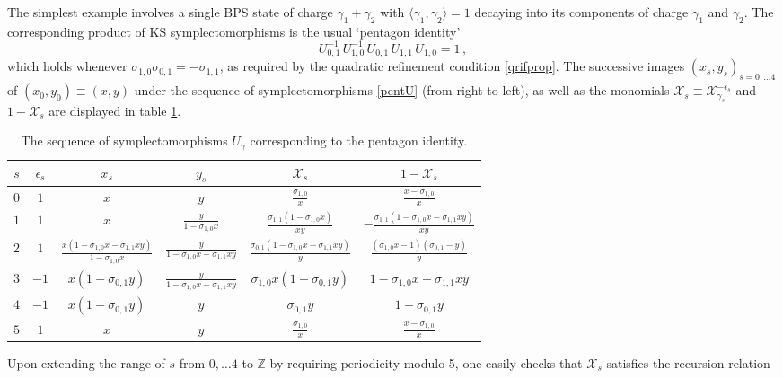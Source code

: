 \documentclass[12pt,reqno]{article}
\numberwithin{equation}{section}
\newcommand{\be}{\begin{equation}}
\newcommand{\ee}{\end{equation}}
\def\eps{\varepsilon}
\newcommand{\cX}{\mathcal{X}}
\newcommand{\IZ}{\mathbb{Z}}
\def\eps{\epsilon}
\def\zz{\cX}
\def\ind{s}
\numberwithin{equation}{section}
\begin{document}
The simplest example involves a single BPS state of charge $\gamma_1+\gamma_2$
with $\langle\gamma_1,\gamma_2\rangle=1$ decaying into its components
of charge $\gamma_1$ and $\gamma_2$. The corresponding product of KS
symplectomorphisms is the usual `pentagon identity'
\be
\label{pentU}
U_{0,1}^{-1}\, U_{1,0}^{-1}\, U_{0,1}\, U_{1,1}\, U_{1,0} = 1\, ,
\ee
which holds whenever $\sigma_{1,0}\sigma_{0,1}=-\sigma_{1,1}$, as required by
the quadratic refinement condition \eqref{qrifprop}. The successive
images  $(x_\ind,y_\ind)_{\ind=0,\dots 4}$ of $(x_0,y_0)\equiv(x,y)$ under the sequence of
symplectomorphisms \eqref{pentU} (from right to left), as well as the monomials
$\zz_\ind\equiv \zz_{\gamma_\ind}^{-\eps_\ind}$ and $1-\zz_\ind$
  are displayed in table \ref{pentagontable}.
\begin{table}[t]
\begin{center}
\begin{tabular}{|c||c|c|c|c|c|}
\hline
$\ind $ & $ \eps_\ind $ & $ x_\ind $ & $ y_\ind $ & $  \zz_\ind $ & $  1-\zz_\ind
$ \\ \hline
$0 $ & $ 1 $ & $ x $ & $ y $ & $ \frac{\sigma_{1,0}}{x} $ & $ \frac{x-\sigma_{1,0}}{x}
$ \\
$1 $ & $ 1 $ & $ x $ & $ \frac{y}{1-\sigma_{1,0}x} $ & $ \frac{\sigma_{1,1}(1-\sigma_{1,0}x)}{xy}$ & $
- \frac{\sigma_{1,1}(1-\sigma_{1,0}x-\sigma_{1,1}xy)}{xy}
$ \\
$2 $ & $ 1 $ & $ \frac{x(1-\sigma_{1,0} x -\sigma_{1,1} xy)}{1-\sigma_{1,0}x} $ & $
\frac{y}{1-\sigma_{1,0}x-\sigma_{1,1} xy} $ & $ \frac{\sigma_{0,1}(1-\sigma_{1,0}x-\sigma_{1,1}xy)}{y}
 $ & $ \frac{(\sigma_{1,0}x-1)(\sigma_{0,1}-y)}{y}
$ \\
$3 $ & $ -1 $ & $ x(1-\sigma_{0,1} y) $ & $  \frac{y}{1-\sigma_{1,0}x-\sigma_{1,1}xy}
$ & $ \sigma_{1,0} x(1-\sigma_{0,1} y) $ & $ 1-\sigma_{1,0}x-\sigma_{1,1}xy
$ \\
$4 $ & $ -1 $ & $ x(1-\sigma_{0,1}y)$ & $ y
$ & $\sigma_{0,1} y $ & $ 1-\sigma_{0,1}y
$ \\
$5 $ & $ 1 $ & $ x $ & $ y$ & $ \frac{\sigma_{1,0}}{x} $ & $ \frac{x-\sigma_{1,0}}{x} $
\\
\hline
\end{tabular}
\end{center}
\caption{The sequence of symplectomorphisms $U_\gamma$ corresponding to the pentagon identity.}
\label{pentagontable}
\end{table}
Upon extending the range of $\ind$ from $0,\dots 4$ to $\IZ$ by requiring
periodicity modulo 5, one easily checks that $\cX_s$ satisfies the recursion relation
\end{document}
